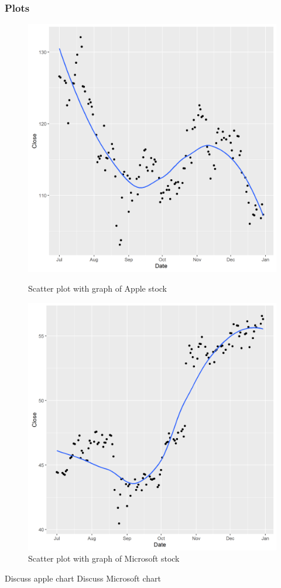 \documentclass[paper=a4, fontsize=11pt]{scrartcl} %
\numberwithin{equation}{section} %
\numberwithin{figure}{section} %
\numberwithin{table}{section} %
\begin{document}
\subsubsection{Plots}
\begin{figure}[!htb]
  \includegraphics[width=\linewidth]{graph/AAPL10.png}
  \caption{Scatter plot with graph of Apple stock}
\endminipage\hfill
{}
  \includegraphics[width=\linewidth]{graph/MSFT10.png}
  \caption{Scatter plot with graph of Microsoft stock}
\endminipage\hfill

\end{figure}
Discuss apple chart
Discuss Microsoft chart
\end{document}
